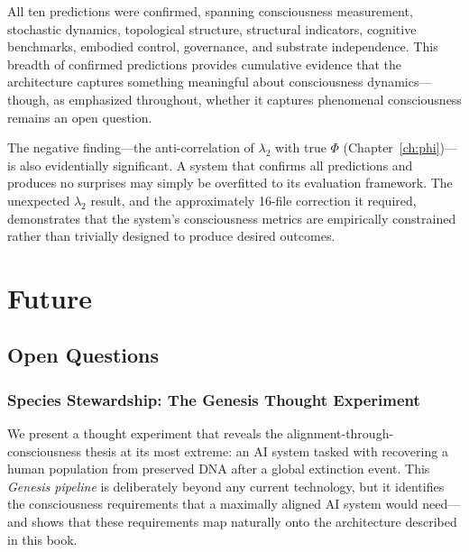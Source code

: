 \documentclass[12pt]{book}
\begin{document}
All ten predictions were confirmed, spanning consciousness measurement, stochastic dynamics, topological structure, structural indicators, cognitive benchmarks, embodied control, governance, and substrate independence. This breadth of confirmed predictions provides cumulative evidence that the architecture captures something meaningful about consciousness dynamics---though, as emphasized throughout, whether it captures phenomenal consciousness remains an open question.

The negative finding---the anti-correlation of $\lambda_2$ with true $\Phi$ (Chapter~\ref{ch:phi})---is also evidentially significant. A system that confirms all predictions and produces no surprises may simply be overfitted to its evaluation framework. The unexpected $\lambda_2$ result, and the approximately 16-file correction it required, demonstrates that the system's consciousness metrics are empirically constrained rather than trivially designed to produce desired outcomes.



\part{Future}

\chapter{Open Questions}
\label{ch:open}
\label{ch:stewardship} %

\section{Species Stewardship: The Genesis Thought Experiment}
\label{sec:genesis}

We present a thought experiment that reveals the alignment-through-consciousness thesis at its most extreme: an AI system tasked with recovering a human population from preserved DNA after a global extinction event. This \textit{Genesis pipeline} is deliberately beyond any current technology, but it identifies the consciousness requirements that a maximally aligned AI system would need---and shows that these requirements map naturally onto the architecture described in this book.
\end{document}
